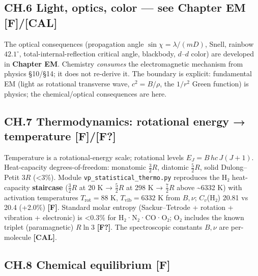 \documentclass[
  10pt,
]{article}
\begin{document}
\hypertarget{ch.6-light-optics-color-see-chapter-em-fcal}{%
\subsection{\texorpdfstring{CH.6 Light, optics, color --- see Chapter EM
\textbf{{[}F{]}/{[}CAL{]}}}{CH.6 Light, optics, color --- see Chapter EM {[}F{]}/{[}CAL{]}}}\label{ch.6-light-optics-color-see-chapter-em-fcal}}

The optical consequences (propagation angle \(\sin\chi = \lambda/(mD)\),
Snell, rainbow \(42.1^\circ\), total-internal-reflection critical angle,
blackbody, \(d\)--\(d\) color) are developed in \textbf{Chapter EM}.
Chemistry \emph{consumes} the electromagnetic mechanism from physics
§10/§14; it does not re-derive it. The boundary is explicit: fundamental
EM (light as rotational transverse wave, \(c^2=B/\rho\), the \(1/r^2\)
Green function) is physics; the chemical/optical consequences are here.

\hypertarget{ch.7-thermodynamics-rotational-energy-temperature-ff}{%
\subsection{\texorpdfstring{CH.7 Thermodynamics: rotational energy →
temperature
\textbf{{[}F{]}/{[}F?{]}}}{CH.7 Thermodynamics: rotational energy → temperature {[}F{]}/{[}F?{]}}}\label{ch.7-thermodynamics-rotational-energy-temperature-ff}}

Temperature is a rotational-energy scale; rotational levels
\(E_J = B\,hc\,J(J{+}1)\). Heat-capacity degrees-of-freedom: monatomic
\(\tfrac32 R\), diatomic \(\tfrac52 R\), solid Dulong--Petit \(3R\)
(\textless3\%). Module \texttt{vp\_statistical\_thermo.py} reproduces
the H₂ heat-capacity \textbf{staircase} (\(\tfrac32 R\) at 20 K →
\(\tfrac52 R\) at 298 K → \(\tfrac72 R\) above \textasciitilde6332 K)
with activation temperatures \(T_{\text{rot}} = 88\) K,
\(T_{\text{vib}} = 6332\) K from \(B,\nu\); \(C_v\)(H₂) 20.81 vs 20.4
(+2.0\%) \textbf{{[}F{]}}. Standard molar entropy (Sackur--Tetrode +
rotation + vibration + electronic) is \textless0.3\% for H₂·N₂·CO·O₂; O₂
includes the known triplet (paramagnetic) \(R\ln 3\) \textbf{{[}F?{]}}.
The spectroscopic constants \(B,\nu\) are per-molecule
\textbf{{[}CAL{]}}.

\hypertarget{ch.8-chemical-equilibrium-f}{%
\subsection{\texorpdfstring{CH.8 Chemical equilibrium
\textbf{{[}F{]}}}{CH.8 Chemical equilibrium {[}F{]}}}\label{ch.8-chemical-equilibrium-f}}
\end{document}
